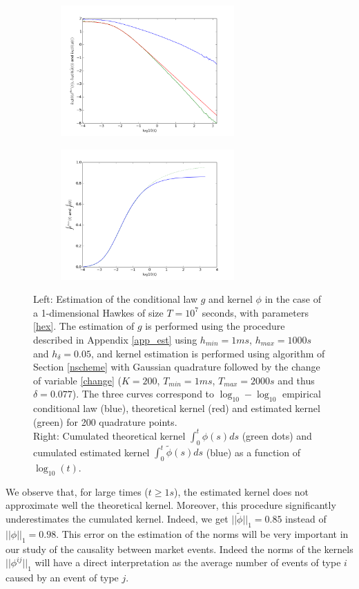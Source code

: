 \documentclass[a4paper,11pt]{article}
\begin{document}
\begin{figure}[H]
\centering
        \begin{subfigure}[b]{0.49\textwidth}
                \includegraphics[width=\textwidth,height=50mm]{logloggauss.png}
        \end{subfigure}
        \begin{subfigure}[b]{0.49\textwidth}
                \includegraphics[width=\textwidth,height=50mm]{cumugauss.png}
        \end{subfigure}

        \caption{Left: Estimation of the conditional law $g$ and kernel $\phi$ in the case of a 1-dimensional Hawkes of size $T=10^7$ seconds, with parameters \eqref{hex}. The estimation of $g$ is performed using the procedure described in  Appendix \ref{app_est} using $h_{min}=1ms$, $h_{max}=1000s$ and $h_\delta=0.05$, and kernel estimation is performed using algorithm of Section \ref{nscheme} with Gaussian quadrature followed by the change of variable \eqref{change}
($K=200$, $T_{min}=1ms$, $T_{max}=2000s$ and thus $\delta=0.077$). The three curves correspond to
$\log_{10}-\log_{10}$ empirical conditional law  (blue), theoretical kernel (red) and estimated kernel (green) for 200 quadrature points.\\
Right: Cumulated theoretical kernel $\int_0^t\phi(s)ds$ (green dots) and cumulated estimated kernel $\int_0^t\tilde{\phi}(s)ds$ (blue) as a function of $\log_{10}(t)$.}
\label{llsim1}
\end{figure}
\noindent We observe that, for large times ($t\geq 1s$), the estimated kernel does not approximate well the theoretical kernel. Moreover, this procedure significantly underestimates the cumulated kernel. Indeed, we get $||\tilde{\phi}||_1=0.85$ instead of $||\phi||_1=0.98$. This error on the estimation of the norms will be very important in our study of the causality between market events. Indeed the norms of the kernels $||\phi^{ij}||_1$ will have a direct interpretation as the average number of events of type $i$ caused by an event of type $j$.\\
\end{document}
